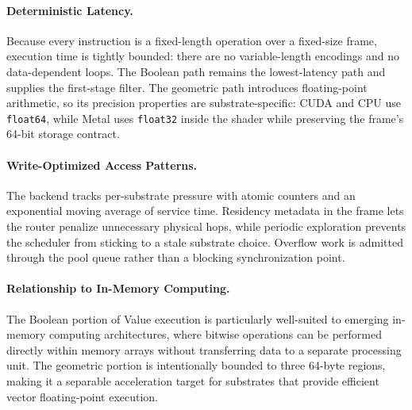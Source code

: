 \paragraph{Deterministic Latency.}
Because every instruction is a fixed-length operation over a fixed-size
frame, execution time is tightly bounded: there are no variable-length
encodings and no data-dependent loops.  The Boolean path remains the
lowest-latency path and supplies the first-stage filter.  The geometric
path introduces floating-point arithmetic, so its precision properties
are substrate-specific: CUDA and CPU use \texttt{float64}, while Metal
uses \texttt{float32} inside the shader while preserving the frame's
64-bit storage contract.

\paragraph{Write-Optimized Access Patterns.}
The backend tracks per-substrate pressure with atomic counters and an
exponential moving average of service time.  Residency metadata in the
frame lets the router penalize unnecessary physical hops, while periodic
exploration prevents the scheduler from sticking to a stale substrate
choice.  Overflow work is admitted through the pool queue rather than a
blocking synchronization point.

\paragraph{Relationship to In-Memory Computing.}
The Boolean portion of Value execution is particularly well-suited to
emerging in-memory computing architectures, where bitwise operations can
be performed directly within memory arrays without transferring data to
a separate processing unit.  The geometric portion is intentionally
bounded to three 64-byte regions, making it a separable acceleration
target for substrates that provide efficient vector floating-point
execution.
